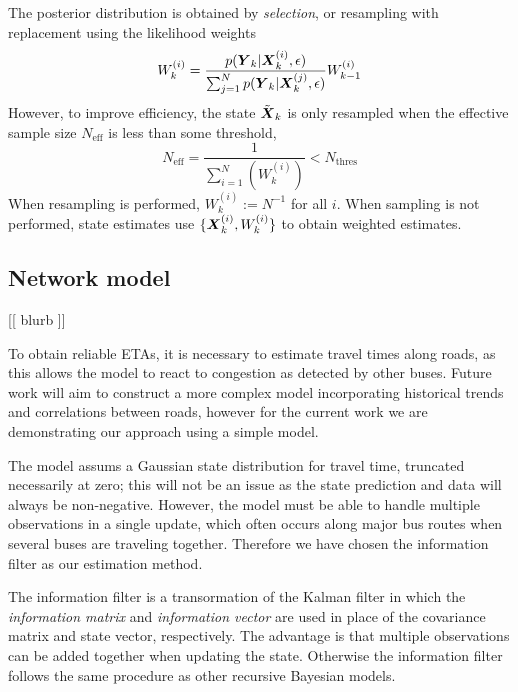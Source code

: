 The posterior distribution is obtained by \emph{selection},
or resampling with replacement using the likelihood weights
\begin{equation*}
W_k^{(i)} = \frac{p(\mbox{$\boldsymbol{Y}$}_k | \mbox{$\boldsymbol{X}$}_k^{(i)}, \epsilon)}{
    \sum_{j=1}^N p(\mbox{$\boldsymbol{Y}$}_k | \mbox{$\boldsymbol{X}$}_k^{(j)}, \epsilon)
} 
W_{k-1}^{(i)} 
\end{equation*}
However, to improve efficiency, the state $\tilde {\mbox{$\boldsymbol{X}$}}_k$ is only resampled
when the effective sample size 
$N_{\text{eff}}$ is less than some threshold,
\begin{equation*}
N_{\text{eff}} = \frac{1}{\sum_{i=1}^N (W_k^{(i)})} < N_{\text{thres}}
\end{equation*}
When resampling is performed, $W_k^{(i)} := N^{-1}$ for all $i$.
When sampling is not performed,
state estimates use $\{\mbox{$\boldsymbol{X}$}_k^{(i)}, W_k^{(i)}\}$ to obtain weighted estimates.


\subsection{Network model}
\label{sec:kf}

[[  blurb  ]]

To obtain reliable ETAs,
it is necessary to estimate travel times along roads,
as this allows the model to react to \rt congestion as detected by other buses.
Future work will aim to construct a more complex model incorporating historical trends 
and correlations between roads, 
however for the current work we are demonstrating our approach
using a simple model.

The model assums a Gaussian state distribution for travel time,
truncated necessarily at zero;
this will not be an issue as the state prediction and data will always be non-negative.
However, the model must be able to handle multiple observations in a single update,
which often occurs along major bus routes when several buses are traveling together.
Therefore we have chosen the information filter as our estimation method.

The information filter is a transormation of the Kalman filter in which the
\emph{information matrix} and \emph{information vector} are used in place of 
the covariance matrix and state vector, respectively.
The advantage is that multiple observations can be added together when updating the state.
Otherwise the information filter follows the same procedure as other recursive Bayesian models.

